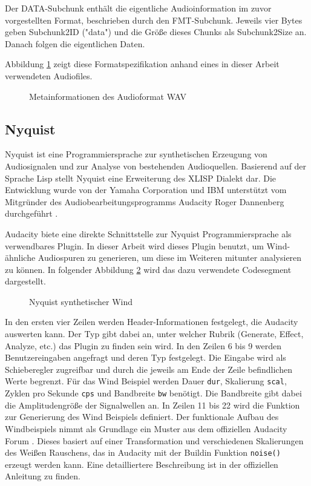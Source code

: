 Der DATA-Subchunk enthält die eigentliche Audioinformation im zuvor vorgestellten Format, beschrieben durch den FMT-Subchunk. Jeweils vier Bytes geben Subchunk2ID ("data") und die Größe dieses Chunks als Subchunk2Size an. Danach folgen die eigentlichen Daten.

Abbildung \ref{fig:wav} zeigt diese Formatspezifikation anhand eines in dieser Arbeit verwendeten Audiofiles.

\begin{figure}[hbt!]
	\centering
	
	\caption{Metainformationen des Audioformat WAV}
	\label{fig:wav}
\end{figure}

\subsection{Nyquist}
Nyquist ist eine Programmiersprache zur synthetischen Erzeugung von Audiosignalen und zur Analyse von bestehenden Audioquellen. Basierend auf der Sprache Lisp stellt Nyquist eine Erweiterung des XLISP Dialekt dar. Die Entwicklung wurde von der Yamaha Corporation und IBM unterstützt vom Mitgründer des Audiobearbeitungsprogramms Audacity Roger Dannenberg durchgeführt \cite{nyquist_official}.

Audacity biete eine direkte Schnittstelle zur Nyquist Programmiersprache als verwendbares Plugin. In dieser Arbeit wird dieses Plugin benutzt, um Wind-ähnliche Audiospuren zu generieren, um diese im Weiteren mitunter analysieren zu können. In folgender Abbildung \ref{sub:nyquist-wind} wird das dazu verwendete Codesegment dargestellt.
\begin{figure}[t!]
		
		\caption{Nyquist synthetischer Wind}
		\label{sub:nyquist-wind}
\end{figure}

In den ersten vier Zeilen werden Header-Informationen festgelegt, die Audacity auswerten kann. Der Typ gibt dabei an, unter welcher Rubrik (Generate, Effect, Analyze, etc.) das Plugin zu finden sein wird. In den Zeilen 6 bis 9 werden Benutzereingaben angefragt und deren Typ festgelegt. Die Eingabe wird als Schieberegler zugreifbar und durch die jeweils am Ende der Zeile befindlichen Werte begrenzt. Für das Wind Beispiel werden Dauer \texttt{dur}, Skalierung \texttt{scal}, Zyklen pro Sekunde \texttt{cps} und Bandbreite \texttt{bw} benötigt. Die Bandbreite gibt dabei die Amplitudengröße der Signalwellen an.
In Zeilen 11 bis 22 wird die Funktion zur Generierung des Wind Beispiels definiert.
Der funktionale Aufbau des Windbeispiels nimmt als Grundlage ein Muster aus dem offiziellen Audacity Forum \cite{wind_effect}. Dieses basiert auf einer Transformation und verschiedenen Skalierungen des Weißen Rauschens, das in Audacity mit der Buildin Funktion \texttt{noise()} erzeugt werden kann. Eine detailliertere Beschreibung ist in der offiziellen Anleitung \cite{ny_manual} zu finden.

